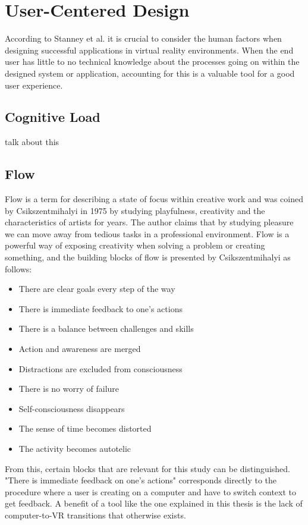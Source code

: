 \section{User-Centered Design}
According to Stanney et al. it is crucial to consider the human factors when designing successful applications in virtual reality environments. When the end user has little to no technical knowledge about the processes going on within the designed system or application, accounting for this is a valuable tool for a good user experience.
\cite{UCD:stanney1998human}
\subsection{Cognitive Load}
talk about this
\subsection{Flow}
Flow is a term for describing a state of focus within creative work and was coined by Csikszentmihalyi in 1975 by studying playfulness, creativity and the characteristics of artists for years. \cite{UCD:boredom1975anxiety} The author claims that by studying pleasure we can move away from tedious tasks in a professional environment. Flow is a powerful way of exposing creativity when solving a problem or creating something, and the building blocks of flow is presented by Csikszentmihalyi as follows:\cite{UCD:csikszentmihalyi1996flow}

\begin{itemize}
  \item There are clear goals every step of the way
  \item There is immediate feedback to one's actions
  \item There is a balance between challenges and skills
  \item Action and awareness are merged
  \item Distractions are excluded from consciousness
  \item There is no worry of failure
  \item Self-consciousness disappears
  \item The sense of time becomes distorted
  \item The activity becomes autotelic
\end{itemize}

From this, certain blocks that are relevant for this study can be distinguished. "There is immediate feedback on one's actions" corresponds directly to the procedure where a user is creating on a computer and have to switch context to get feedback. A benefit of a tool like the one explained in this thesis is the lack of computer-to-VR transitions that otherwise exists.
